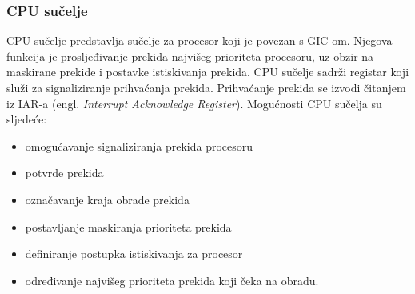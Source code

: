 \documentclass[times, utf8, diplomski, numeric]{fer}
\begin{document}
\subsubsection{CPU sučelje}
CPU sučelje predstavlja sučelje za procesor koji je povezan s GIC-om. Njegova funkcija je prosljeđivanje prekida najvišeg
prioriteta procesoru, uz obzir na maskirane prekide i postavke istiskivanja prekida. CPU sučelje sadrži registar koji
služi za signaliziranje prihvaćanja prekida. Prihvaćanje prekida se izvodi čitanjem iz IAR-a (engl. \textit{Interrupt
Acknowledge Register}). Mogućnosti CPU sučelja su sljedeće:
\begin{itemize}
  \item{omogućavanje signaliziranja prekida procesoru}
  \item{potvrde prekida}
  \item{označavanje kraja obrade prekida}
  \item{postavljanje maskiranja prioriteta prekida}
  \item{definiranje postupka istiskivanja za procesor}
  \item{određivanje najvišeg prioriteta prekida koji čeka na obradu.}
\end{itemize}
\end{document}
